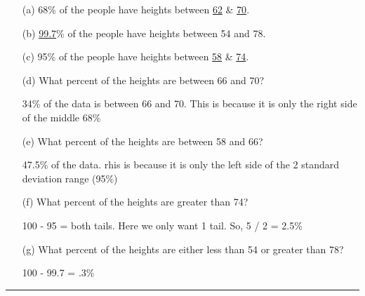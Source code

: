 \documentclass{report}
\begin{document}
\begin{enumerate}
  \item[(a)] 68\% of the people have heights between \underline{62} \& \underline{70}.
    
    \vspace{1em}
    
    \item[(b)] \underline{99.7}\% of the people have heights between 54 and 78.
    
    \vspace{1em}
    
    \item[(c)] 95\% of the people have heights between \underline{58} \& \underline{74}.
    
    \vspace{1em}
    
    \item[(d)] What percent of the heights are between 66 and 70?
      \vspace{2mm}

   34\% of the data  is between 66 and 70. This is because it is only the right side of the middle 68\% 

    \vspace{1em}
    
    \item[(e)] What percent of the heights are between 58 and 66?
      \vspace{2mm} 

      47.5\% of the data. rhis is because it is only the left side of the 2 standard deviation range (95\%)
    \vspace{1em}
    
    \item[(f)] What percent of the heights are greater than 74?
      \vspace{2mm}

      100 - 95 = both tails. Here we only want 1 tail. So, 5 / 2 = 2.5\%
    
    \vspace{1em}
    
    \item[(g)] What percent of the heights are either less than 54 or greater than 78?
      \vspace{2mm} 

      100 - 99.7 = .3\%
    \vspace{1em}
\end{enumerate}
\bigbreak \noindent
\hrule
\bigbreak \noindent
\end{document}
